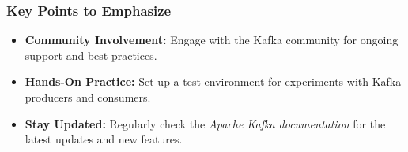 \documentclass[aspectratio=169]{beamer}
\begin{document}
\begin{frame}[fragile]
  \frametitle{Key Points to Emphasize}
  \begin{itemize}
    \item \textbf{Community Involvement:} Engage with the Kafka community for ongoing support and best practices.
   
    \item \textbf{Hands-On Practice:} Set up a test environment for experiments with Kafka producers and consumers.
    
    \item \textbf{Stay Updated:} Regularly check the \textit{Apache Kafka documentation} for the latest updates and new features.
  \end{itemize}
\end{frame}
\end{document}
